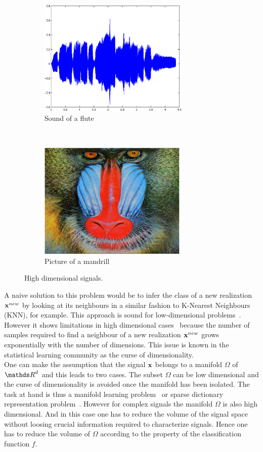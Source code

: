 \documentclass[a4paper,11pt]{report}
\begin{document}
		\begin{figure}[h]
			\centering
			\begin{subfigure}[t]{0.48\textwidth}
				\centering
				\includegraphics[height=2.2in]{waveform_flute.eps}
				\caption{Sound of a flute}
			\end{subfigure}%
			~ 
			\begin{subfigure}[t]{0.48\textwidth}
        \centering
        \includegraphics[height=2.2in]{im_mandrill.eps}
        \caption{Picture of a mandrill}
			\end{subfigure}
			\caption{High dimensional signals.}
			\label{fig:highDim signals}
		\end{figure}
		
		A naive solution to this problem would be to infer the class of a new realization ${\bf x}^{new}$ by looking at its neighbours in a similar fashion to K-Nearest Neighbours (KNN), for example. This approach is sound for low-dimensional problems~\citep{cover1967nearest}. However it shows limitations in high dimensional cases~\citep{beyer1999nearest} because the number of samples required to find a neighbour of a new realization ${\bf x}^{new}$ grows exponentially with the number of dimensions. This issue is known in the statistical learning community as the curse of dimensionality.\\
			
		One can make the assumption that the signal ${\bf x}$ belongs to a manifold $\Omega$ of $\dsR^{d}$ and this leads to two cases. The subset $\Omega$ can be low dimensional and the curse of dimensionality is avoided once the manifold has been isolated. The task at hand is thus a manifold learning problem~\citep{lin2008riemannian} \citep{zhang2012adaptive} or sparse dictionary representation problem~\citep{kreutz2003dictionary}. However for complex signals the manifold $\Omega$ is also high dimensional. And in this case one has to reduce the volume of the signal space without loosing crucial information required to characterize signals. Hence one has to reduce the volume of $\Omega$ according to the property of the classification function $f$.
		
\end{document}
